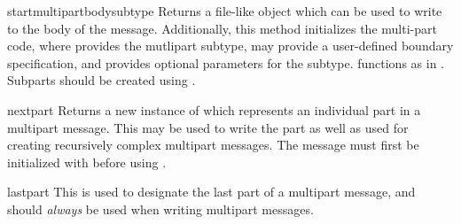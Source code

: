 \begin{methoddesc}{startmultipartbody}{subtype}
Returns a file-like object which can be used to write to the
body of the message.  Additionally, this method initializes the
multi-part code, where  provides the mutlipart subtype,
 may provide a user-defined boundary specification, and
 provides optional parameters for the subtype.
 functions as in .  Subparts should be
created using .
\end{methoddesc}

\begin{methoddesc}{nextpart}{}
Returns a new instance of  which represents an
individual part in a multipart message.  This may be used to write the 
part as well as used for creating recursively complex multipart
messages. The message must first be initialized with
 before using .
\end{methoddesc}

\begin{methoddesc}{lastpart}{}
This is used to designate the last part of a multipart message, and
should \emph{always} be used when writing multipart messages.
\end{methoddesc}
